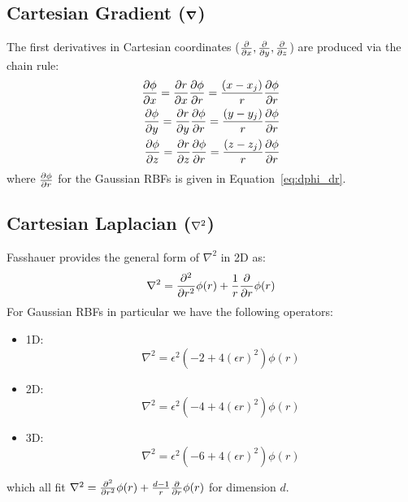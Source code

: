 \documentclass[11pt]{report}
\begin{document}
{\subsection{Cartesian Gradient ($\grad$)}
The first derivatives in Cartesian coordinates ($\frac{\partial }{\partial x}, \frac{\partial }{\partial y}, \frac{\partial }{\partial z}$) are produced via the chain rule:
	\begin{align*} 
	 \frac{\partial \phi}{\partial x} = \frac{\partial r}{\partial x} \frac{\partial \phi}{\partial r} = \frac{(x-x_{j})}{r} \frac{\partial \phi}{\partial r} \\
	 \frac{\partial \phi}{\partial y} = \frac{\partial r}{\partial y} \frac{\partial \phi}{\partial r} = \frac{(y-y_{j})}{r} \frac{\partial \phi}{\partial r} \\
	 \frac{\partial \phi}{\partial z} = \frac{\partial r}{\partial z} \frac{\partial \phi}{\partial r} = \frac{(z-z_{j})}{r} \frac{\partial \phi}{\partial r}
	\end{align*}
where $\frac{\partial \phi}{\partial r}$ for the Gaussian RBFs is given in Equation~\ref{eq:dphi_dr}. 


\subsection{Cartesian Laplacian ($\Laplacian$)}
Fasshauer \cite{Fasshauer2007} provides the general form of $\nabla^2$ in 2D as: 
\begin{align*}
\nabla^2 = \frac{\partial^2 }{\partial r^2}\phi(r) + \frac{1}{r}\frac{\partial }{\partial r} \phi(r) 
\end{align*}
For Gaussian RBFs in particular we have the following operators:
\begin{itemize}
\item 1D: $$\nabla^2 = \epsilon^2 (-2 + 4 (\epsilon r)^2) \phi(r)$$
\item 2D: $$\nabla^2 = \epsilon^2 (-4 + 4 (\epsilon r)^2) \phi(r)$$
\item 3D: $$\nabla^2 = \epsilon^2 (-6 + 4 (\epsilon r)^2) \phi(r)$$
\end{itemize}
which all fit $\nabla^2 = \frac{\partial^2 }{\partial r^2}\phi(r) + \frac{d - 1}{r}\frac{\partial }{\partial r} \phi(r)$ for dimension $d$.

}
\end{document}
